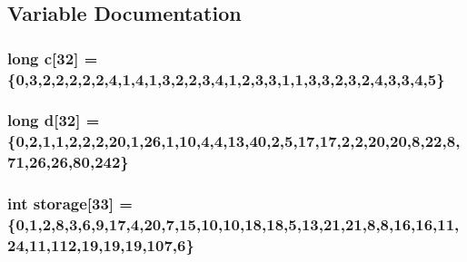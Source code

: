 \subsection{Variable Documentation}
\hypertarget{Collatz_8c_09_09_a9160a09deb1711108372467e0f49b551}{
\subsubsection[{c}]{\setlength{\rightskip}{0pt plus 5cm}long c\mbox{[}32\mbox{]} = \{0,3,2,2,2,2,2,4,1,4,1,3,2,2,3,4,1,2,3,3,1,1,3,3,2,3,2,4,3,3,4,5\}}}\label{Collatz_8c_09_09_a9160a09deb1711108372467e0f49b551}
\hypertarget{Collatz_8c_09_09_a12b98f69417e4e2643b390e987acddcb}{
\subsubsection[{d}]{\setlength{\rightskip}{0pt plus 5cm}long d\mbox{[}32\mbox{]} = \{0,2,1,1,2,2,2,20,1,26,1,10,4,4,13,40,2,5,17,17,2,2,20,20,8,22,8,71,26,26,80,242\}}}\label{Collatz_8c_09_09_a12b98f69417e4e2643b390e987acddcb}
\hypertarget{Collatz_8c_09_09_abf138feaaa93a33fa911a7f64e7ac902}{
\subsubsection[{storage}]{\setlength{\rightskip}{0pt plus 5cm}int storage\mbox{[}33\mbox{]} = \{0,1,2,8,3,6,9,17,4,20,7,15,10,10,18,18,5,13,21,21,8,8,16,16,11,24,11,112,19,19,19,107,6\}}}\label{Collatz_8c_09_09_abf138feaaa93a33fa911a7f64e7ac902}
